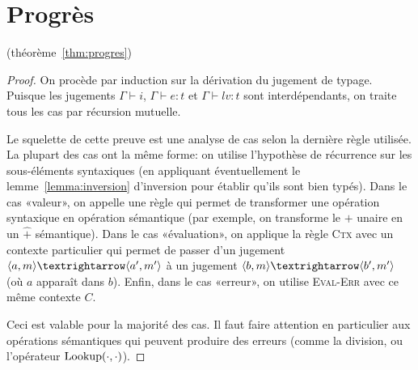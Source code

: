 \section{Progrès}
\label{proof:progres}

(théorème~\ref{thm:progres})

\begin{proof}

On procède par induction sur la dérivation du jugement de typage. Puisque les
jugements $Γ ⊢ i$, $Γ ⊢ e : t$ et $Γ ⊢ lv : t$ sont interdépendants, on traite
tous les cas par récursion mutuelle.

Le squelette de cette preuve est une analyse de cas selon la dernière règle
utilisée. La plupart des cas ont la même forme: on utilise l'hypothèse de
récurrence sur les sous-éléments syntaxiques (en appliquant éventuellement le
lemme~\ref{lemma:inversion} d'inversion pour établir qu'ils sont bien typés).
Dans le cas «valeur», on appelle une règle qui permet de transformer une
opération syntaxique en opération sémantique (par exemple, on transforme le $+$
unaire en un $\widehat{+}$ sémantique). Dans le cas «évaluation», on applique
la règle \textsc{Ctx} avec un contexte particulier qui permet de passer d'un
jugement $\mm{m}{a}{m'}{a'}$ à un jugement $\mm{m}{b}{m'}{b'}$ (où $a$ apparaît
dans $b$). Enfin, dans le cas «erreur», on utilise \textsc{Eval-Err} avec ce
même contexte $C$.

Ceci est valable pour la majorité des cas. Il faut faire attention en
particulier aux opérations sémantiques qui peuvent produire des erreurs (comme
la division, ou l'opérateur $\mathrm{Lookup} (\cdot, \cdot)$).





\end{proof}
